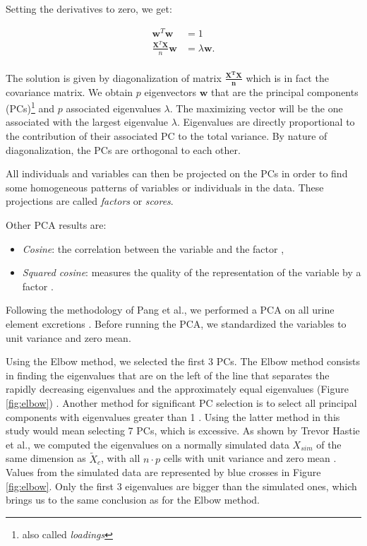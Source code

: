\newpage

Setting the derivatives to zero, we get:

\begin{align*}
\textbf{w}^T \textbf{w} & = 1 \\
\frac{\textbf{X}^T \textbf{X}}{n} \textbf{w} & = \lambda \textbf{w}. \\
\end{align*}

The solution is given by diagonalization of matrix $\mathbf{\frac{X^T X}{n}}$ which is in fact the covariance matrix. We obtain $p$ eigenvectors $\mathbf{w}$ that are the principal components (PCs)\footnote{also called \emph{loadings}} and $p$ associated eigenvalues $\lambda$. The maximizing vector will be the one associated with the largest eigenvalue $\lambda$. Eigenvalues are directly proportional to the contribution of their associated PC to the total variance. By nature of diagonalization, the PCs are orthogonal to each other.

All individuals and variables can then be projected on the PCs in order to find some homogeneous patterns of variables or individuals in the data. These projections are called \emph{factors} or \emph{scores}.

Other PCA results are:
\begin{itemize}
\item \emph{Cosine}: the correlation between the variable and the factor \cite{tille_multivariate_nodate},
\item \emph{Squared cosine}: measures the quality of the representation of the variable by a factor \cite{tille_multivariate_nodate}.
\end{itemize}

Following the methodology of Pang et al., we performed a PCA on all urine element excretions \cite{pang_metal_2016}. Before running the PCA, we standardized the variables to unit variance and zero mean.

Using the Elbow method, we selected the first 3 PCs. The Elbow method consists in finding the eigenvalues that are on the left of the line that separates the rapidly decreasing eigenvalues and the approximately equal eigenvalues (Figure \ref{fig:elbow}) \cite{abdi_principal_2010}. Another method for significant PC selection is to select all principal components with eigenvalues greater than 1 \cite{tille_multivariate_nodate}. Using the latter method in this study would mean selecting 7 PCs, which is excessive. As shown by Trevor Hastie et al., we computed the eigenvalues on a normally simulated data $X_{sim}$ of the same dimension as $\tilde{X}_c$, with all $n\cdot p$ cells with unit variance and zero mean \cite{james_introduction_2013}. Values from the simulated data are represented by blue crosses in Figure \ref{fig:elbow}. Only the first 3 eigenvalues are bigger than the simulated ones, which brings us to the same conclusion as for the Elbow method.

